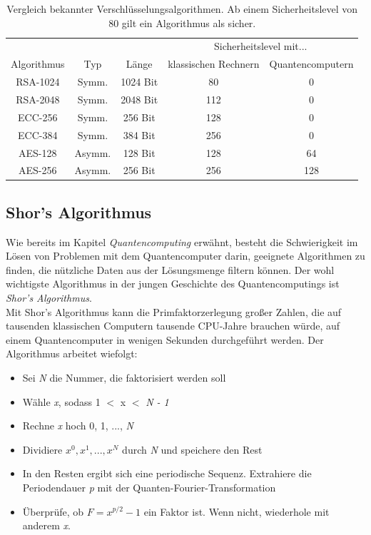 \documentclass[12pt]{article}
\begin{document}
\begin{table} [h]
    \centering
    \begin{tabular}{|c|c|c|c|c|}
    \hline
        & & & \multicolumn{2}{|c|}{Sicherheitslevel mit...} \\
        Algorithmus & Typ & Länge & klassischen Rechnern & Quantencomputern \\
    \hline
        RSA-1024 & Symm. & 1024 Bit & 80 & 0\\
        RSA-2048 & Symm. & 2048 Bit & 112 & 0\\
        ECC-256 & Symm. & 256 Bit & 128 & 0\\
        ECC-384 & Symm. & 384 Bit & 256 & 0\\
        AES-128 & Asymm. & 128 Bit & 128 & 64\\
        AES-256 & Asymm. & 256 Bit & 256 & 128\\
    \hline
    \end{tabular}
    \caption{Vergleich bekannter Verschlüsselungsalgorithmen. Ab einem Sicherheitslevel von 80 gilt ein Algorithmus als sicher. \cite{mavroeidis2018impact}}
    \label{tab:Algo-Vergleich}
\end{table}

\subsection{Shor's Algorithmus}

Wie bereits im Kapitel \textit{Quantencomputing} erwähnt, besteht die Schwierigkeit im Lösen von Problemen mit dem Quantencomputer darin, geeignete Algorithmen zu finden, die nützliche Daten aus der Lösungsmenge filtern können. Der wohl wichtigste Algorithmus in der jungen Geschichte des Quantencomputings ist \textit{Shor's Algorithmus}. \cite{shor1998quantum} \\

Mit Shor's Algorithmus kann die Primfaktorzerlegung großer Zahlen, die auf tausenden klassischen Computern tausende CPU-Jahre brauchen würde, auf einem Quantencomputer in wenigen Sekunden durchgeführt werden. Der Algorithmus arbeitet wiefolgt: \cite{mavroeidis2018impact} \\
\begin{itemize}
    \item Sei \textit{N} die Nummer, die faktorisiert werden soll
    \item Wähle \textit{x}, sodass 1 $<$ x $<$ \textit{N - 1}
    \item Rechne \textit{x} hoch 0, 1, ..., \textit{N}
    \item Dividiere $x^0, x^1, ..., x^N$ durch \textit{N} und speichere den Rest 
    \item In den Resten ergibt sich eine periodische Sequenz. Extrahiere die Periodendauer \textit{p} mit der Quanten-Fourier-Transformation
    \item Überprüfe, ob $F = x^{p/2} - 1$ ein Faktor ist. Wenn nicht, wiederhole mit anderem \textit{x}.
\end{itemize}
\end{document}
